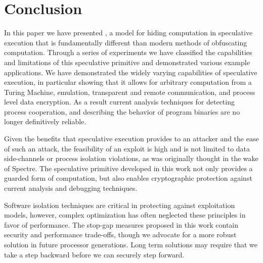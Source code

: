 
\section{Conclusion}

In this paper we have presented \speculake, a model for hiding computation in
speculative execution that is fundamentally different than modern methods of
obfuscating computation. Through a series of experiments we have classified the
capabilities and limitations of this speculative primitive and demonstrated
various example applications. We have demonstrated the widely varying
capabilities of speculative execution, in particular showing that it allows for
arbitrary computation from a Turing Machine, emulation, transparent and remote
communication, and process level data encryption. As a result current analysis
techniques for detecting process cooperation, and describing the behavior of
program binaries are no longer definitively reliable.

Given the benefits that speculative execution provides to an attacker and the
ease of such an attack, the feasibility of an \speculake exploit is high and is
not limited to data side-channels or process isolation violations, as was
originally thought in the wake of Spectre. The speculative primitive developed
in this work not only provides a guarded form of computation, but also enables
cryptographic protection against current analysis and debugging techniques.  

Software isolation techniques are critical in protecting against exploitation
models, however, complex optimization has often neglected these principles in
favor of performance. The stop-gap measures proposed in this work contain
security and performance trade-offs, though we advocate for a more robust
solution in future processor generations. Long term solutions may require that
we take a step backward before we can securely step forward.

